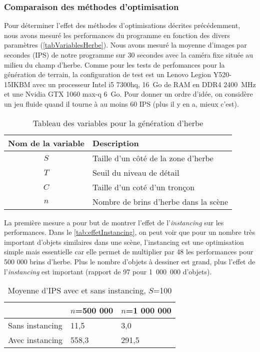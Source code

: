 \pagebreak
\subsubsection{Comparaison des méthodes d'optimisation}

Pour déterminer l'effet des méthodes d'optimisations décrites précédemment, nous avons mesuré les performances du programme en fonction des divers paramètres (\autoref{tabVariablesHerbe}). Nous avons mesuré la moyenne d'images par secondes (IPS) de notre programme sur 30 secondes avec la caméra fixe située au milieu du champ d'herbe. 
Comme pour les tests de perfomances pour la génération de terrain, la configuration de test est un Lenovo Legion Y520-15IKBM avec un processeur Intel i5 7300hq, 16~Go de RAM en DDR4 2400~MHz et une Nvidia GTX 1060 max-q 6~Go. Pour donner un ordre d'idée, on considère un jeu fluide quand il tourne à au moins 60 IPS (plus il y en a, mieux c'est).

\begin{table}[ht]
	\centering
	\begin{tabular}{|c|l|}
		\hline
		\textbf{Nom de la variable} & \textbf{Description}  \\
		\hline
		$S$ & Taille d'un côté de la zone d'herbe\\
		$T$ & Seuil du niveau de détail\\
		$C$ & Taille d'un coté d'un tronçon\\
		$n$ & Nombre de brins d'herbe dans la scène \\
		\hline
	\end{tabular}
	\caption{Tableau des variables pour la génération d'herbe}
	\label{tabVariablesHerbe}
\end{table}

La première mesure a pour but de montrer l'effet de l'\textit{instancing} sur les performances. Dans le \autoref{tab:effetInstancing}, on peut voir que pour un nombre très important d'objets similaires dans une scène, l'instancing est une optimisation simple mais essentielle car elle permet de multiplier par 48 les performances pour 500 000 brins d'herbe. Plus le nombre d'objets à dessiner est grand, plus l'effet de l'\textit{instancing} est important (rapport de 97 pour 1~000~000 d'objets).

\begin{table}[H]
	\centering
	\begin{tabular}{|l|l|l|}
		\hline
		
						& $n$=500 000	& $n$=1 000 000 \\ \hline
		Sans instancing &	11,5		&      3,0    	\\
		Avec instancing & 	558,3		&  291,5     \\ \hline
	\end{tabular}
	\caption{Moyenne d'IPS avec et sans instancing, $S$=100}
	\label{tab:effetInstancing}
\end{table}


